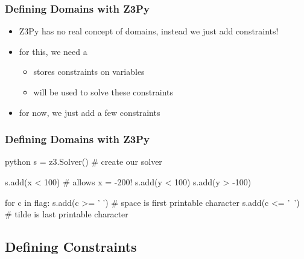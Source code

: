 \documentclass[aspectratio=169]{beamer}
\begin{document}
{\begin{frame}[fragile]
    \frametitle{Defining Domains with Z3Py}
    \begin{itemize}
        \item Z3Py has no real concept of domains, instead we just add constraints!
        \item for this, we need a 
        \begin{itemize}
            \item stores constraints on variables
            \item will be used to solve these constraints
        \end{itemize}
        \item for now, we just add a few constraints
    \end{itemize}
\end{frame}

\begin{frame}[fragile]
    \frametitle{Defining Domains with Z3Py}
    \begin{codebox}{python}
s = z3.Solver() # create our solver

s.add(x < 100) # allows x = -200!
s.add(y < 100)
s.add(y > -100)

for c in flag:
    s.add(c >= ' ') # space is first printable character
    s.add(c <= '~') # tilde is last printable character\end{codebox}
\end{frame}

\subsection{Defining Constraints}

}
\end{document}
